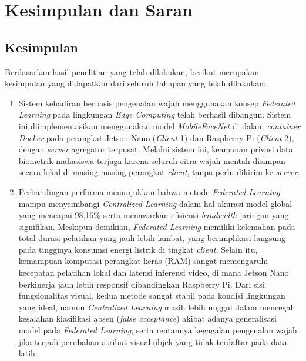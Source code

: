\chapter{Kesimpulan dan Saran}
\label{chap:kesimpulan-saran}

\section{Kesimpulan}
\label{sec:kesimpulan}

Berdasarkan hasil penelitian yang telah dilakukan, berikut merupakan kesimpulan yang didapatkan dari seluruh tahapan yang telah dilakukan:
\begin{enumerate}
    \item Sistem kehadiran berbasis pengenalan wajah menggunakan konsep \textit{Federated Learning} pada lingkungan \textit{Edge Computing} telah berhasil dibangun. Sistem ini diimplementasikan menggunakan model \textit{MobileFaceNet} di dalam \textit{container Docker} pada perangkat Jetson Nano (\textit{Client} 1) dan Raspberry Pi (\textit{Client} 2), dengan \textit{server} agregator terpusat. Melalui sistem ini, keamanan privasi data biometrik mahasiswa terjaga karena seluruh citra wajah mentah disimpan secara lokal di masing-masing perangkat \textit{client}, tanpa perlu dikirim ke \textit{server}.
    
    \item Perbandingan performa menunjukkan bahwa metode \textit{Federated Learning} mampu menyeimbangi \textit{Centralized Learning} dalam hal akurasi model global yang mencapai 98,16\% serta menawarkan efisiensi \textit{bandwidth} jaringan yang signifikan. Meskipun demikian, \textit{Federated Learning} memiliki kelemahan pada total durasi pelatihan yang jauh lebih lambat, yang berimplikasi langsung pada tingginya konsumsi energi listrik di tingkat \textit{client}. Selain itu, kemampuan komputasi perangkat keras (RAM) sangat memengaruhi kecepatan pelatihan lokal dan latensi inferensi video, di mana Jetson Nano berkinerja jauh lebih responsif dibandingkan Raspberry Pi. Dari sisi fungsionalitas visual, kedua metode sangat stabil pada kondisi lingkungan yang ideal, namun \textit{Centralized Learning} masih lebih unggul dalam mencegah kesalahan klasifikasi absen (\textit{false acceptance}) akibat adanya generalisasi model pada \textit{Federated Learning}, serta rentannya kegagalan pengenalan wajah jika terjadi perubahan atribut visual objek yang tidak terdaftar pada data latih.
\end{enumerate}

